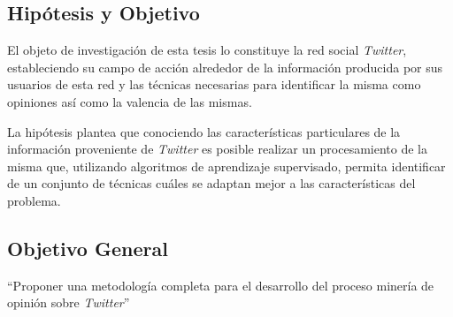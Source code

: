 \begin{introduction}

\section*{Hipótesis y Objetivo}

El objeto de investigación de esta tesis
lo constituye la red social \emph{Twitter},
estableciendo su campo de acción alrededor
de la información
producida por sus usuarios de esta red y las
técnicas necesarias para identificar la misma
como opiniones así como la valencia de las mismas.

La hipótesis plantea que conociendo las características
particulares de la información proveniente de \emph{Twitter}
es posible realizar un procesamiento de la misma que,
utilizando algoritmos de aprendizaje supervisado, 
permita identificar de un conjunto de técnicas cuáles 
se adaptan mejor a las características del problema. 
  
  \subsection*{Objetivo General}
  
  ``Proponer una metodología completa para el desarrollo del proceso
minería de opinión sobre \emph{Twitter}''


\end{introduction}
